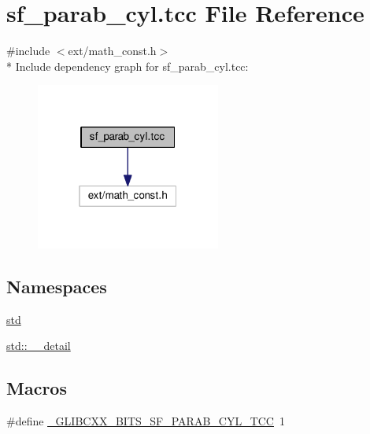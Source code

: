 \hypertarget{sf__parab__cyl_8tcc}{}\section{sf\+\_\+parab\+\_\+cyl.\+tcc File Reference}
\label{sf__parab__cyl_8tcc}
{\ttfamily \#include $<$ext/math\+\_\+const.\+h$>$}\\*
Include dependency graph for sf\+\_\+parab\+\_\+cyl.\+tcc\+:\nopagebreak
\begin{figure}[H]
\begin{center}
\leavevmode
\includegraphics[width=172pt]{sf__parab__cyl_8tcc__incl}
\end{center}
\end{figure}
\subsection*{Namespaces}
\begin{DoxyCompactItemize}
\item 
 \hyperlink{namespacestd}{std}
\item 
 \hyperlink{namespacestd_1_1____detail}{std\+::\+\_\+\+\_\+detail}
\end{DoxyCompactItemize}
\subsection*{Macros}
\begin{DoxyCompactItemize}
\item 
\#define \hyperlink{sf__parab__cyl_8tcc_a132aa9631b9dba6c29027d48adf79d81}{\+\_\+\+G\+L\+I\+B\+C\+X\+X\+\_\+\+B\+I\+T\+S\+\_\+\+S\+F\+\_\+\+P\+A\+R\+A\+B\+\_\+\+C\+Y\+L\+\_\+\+T\+C\+C}~1
\end{DoxyCompactItemize}
